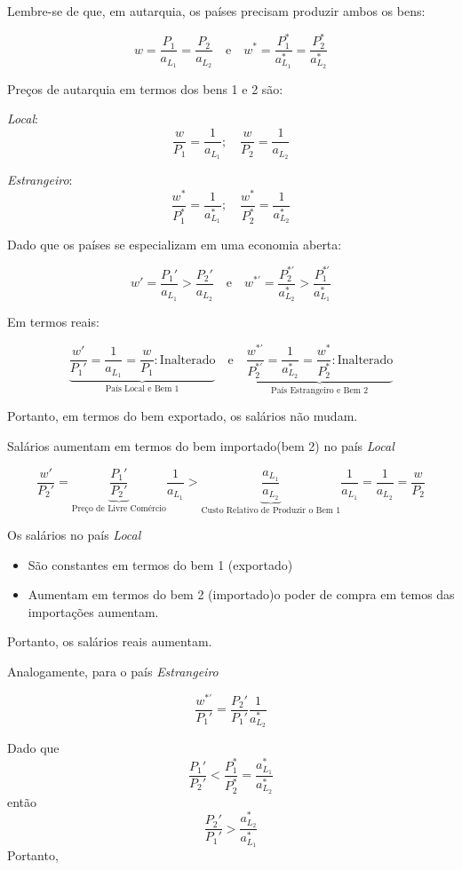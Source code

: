 \documentclass[a4paper,12pt]{article}[abntex2]
\begin{document}
Lembre-se de que, em autarquia, os países precisam produzir ambos os bens:

\[
w = \frac{P_1}{a_{L_1}} = \frac{P_2}{a_{L_2}} \quad \text{e} \quad w^* = \frac{P_1^*}{a_{L_1}^*} = \frac{P_2^*}{a_{L_2}^*}
\]

Preços de autarquia em termos dos bens 1 e 2 são:

\textit{Local}:
\[
\frac{w}{P_1} = \frac{1}{a_{L_1}}; \quad \frac{w}{P_2} = \frac{1}{a_{L_2}}
\]

\textit{Estrangeiro}:
\[
\frac{w^*}{P_1^*} = \frac{1}{a_{L_1}^*}; \quad \frac{w^*}{P_2^*} = \frac{1}{a_{L_2}^*}
\]

Dado que os países se especializam em uma economia aberta:

\[
w' = \frac{P_1'}{a_{L_1}} > \frac{P_2'}{a_{L_2}} 
\quad \text{e} \quad 
w^{*'} = \frac{P_2^{*'}}{a_{L_2}^*} > \frac{P_1^{*'}}{a_{L_1}^*}
\]

Em termos reais:

\[
\underbrace{\frac{w'}{P_1'} = \frac{1}{a_{L_1}} = \frac{w}{P_1} : \text{Inalterado}}_\text{País Local e Bem 1}
\quad \text{e} \quad 
\underbrace{\frac{w^{*'}}{P_2^{*'}} = \frac{1}{a_{L_2}^*} = \frac{w^*}{P_2^*} : \text{Inalterado}}_\text{País Estrangeiro e Bem 2}
\]

Portanto, em termos do bem exportado, os salários não mudam.

Salários aumentam em termos do bem importado(bem 2) no país \textit{Local}

\[
\frac{w'}{P_2'} = \underbrace{\frac{P_1'}{P_2'}}_\text{Preço de Livre Comércio} \frac{1}{a_{L_1}} > \underbrace{\frac{a_{L_1}}{a_{L_2}}}_\text{Custo Relativo de Produzir o Bem 1} \frac{1}{a_{L_1}} = \frac{1}{a_{L_2}} = \frac{w}{P_2}
\]


Os salários no país \textit{Local}
\begin{itemize}
    \item São constantes em termos do bem 1 (exportado)
    \item Aumentam em termos do bem 2 (importado)o poder de compra em temos das importações aumentam.
\end{itemize}

Portanto, os salários reais aumentam.

Analogamente, para o país \textit{Estrangeiro}

\[
\frac{w^{*'}}{P_1'} = \frac{P_2'}{P_1'} \frac{1}{a_{L_2}^*}
\]

Dado que 
\[
\frac{P_1'}{P_2'} < \frac{P_1^*}{P_2^*} = \frac{a_{L_1}^*}{a_{L_2}^*}
\]
então 
\[
\frac{P_2'}{P_1'} > \frac{a_{L_2}^*}{a_{L_1}^*}
\]
Portanto,
\end{document}
